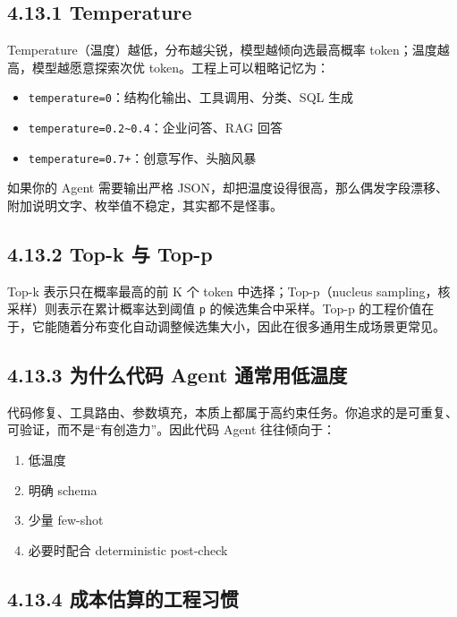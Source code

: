 \subsection{4.13.1 Temperature}

Temperature（温度）越低，分布越尖锐，模型越倾向选最高概率 token；温度越高，模型越愿意探索次优 token。工程上可以粗略记忆为：


\begin{itemize}[leftmargin=2em]
\item \texttt{temperature=0}：结构化输出、工具调用、分类、SQL 生成
\item \texttt{temperature=0.2\textasciitilde{}0.4}：企业问答、RAG 回答
\item \texttt{temperature=0.7+}：创意写作、头脑风暴
\end{itemize}

如果你的 Agent 需要输出严格 JSON，却把温度设得很高，那么偶发字段漂移、附加说明文字、枚举值不稳定，其实都不是怪事。


\subsection{4.13.2 Top-k 与 Top-p}

Top-k 表示只在概率最高的前 K 个 token 中选择；Top-p（nucleus sampling，核采样）则表示在累计概率达到阈值 \texttt{p} 的候选集合中采样。Top-p 的工程价值在于，它能随着分布变化自动调整候选集大小，因此在很多通用生成场景更常见。


\subsection{4.13.3 为什么代码 Agent 通常用低温度}

代码修复、工具路由、参数填充，本质上都属于高约束任务。你追求的是可重复、可验证，而不是``有创造力''。因此代码 Agent 往往倾向于：


\begin{enumerate}[leftmargin=2em]
\item 低温度
\item 明确 schema
\item 少量 few-shot
\item 必要时配合 deterministic post-check
\end{enumerate}

\subsection{4.13.4 成本估算的工程习惯}

